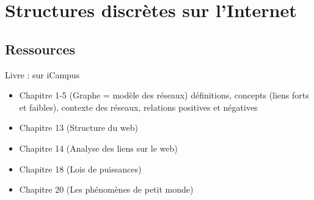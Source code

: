 \chapter{Structures discrètes sur l'Internet}

\section{Ressources}
Livre : sur iCampus 
\begin{itemize}
\item Chapitre 1-5 (Graphe = modèle des réseaux) définitions, concepts (liens forts et faibles), contexte des réseaux, relations positives et négatives
\item Chapitre 13 (Structure du web)
\item Chapitre 14 (Analyse des liens sur le web)
\item Chapitre 18 (Lois de puissances)
\item Chapitre 20 (Les phénomènes de petit monde)
\end{itemize}
